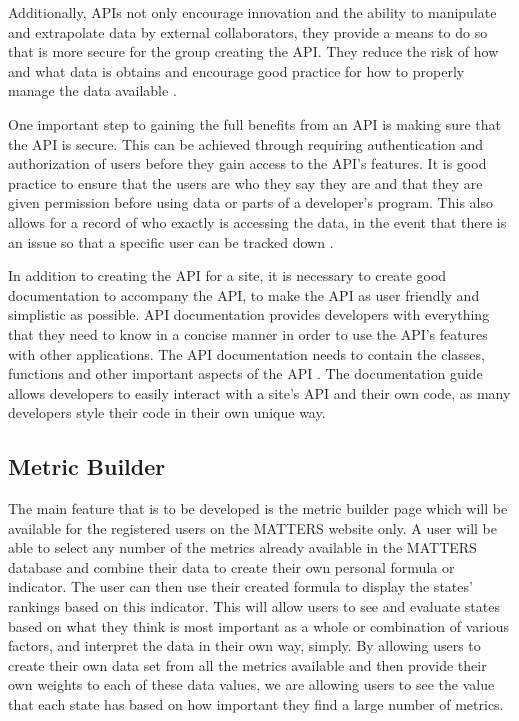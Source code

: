 		Additionally, APIs not only encourage innovation and the ability to manipulate and 
		extrapolate data by external collaborators, they provide a means to do so that is 
		more secure for the group creating the API. They reduce the risk of how and what data 
		is obtains and encourage good practice for how to properly manage the data 
		available \cite{readwrite}.

	One important step to gaining the full benefits from an API is making sure that the API is 
	secure. This can be achieved through requiring authentication and authorization of users 
	before they gain access to the API’s features. It is good practice to ensure that the users 
	are who they say they are and that they are given permission before using data or parts of 
	a developer’s program. This also allows for a record of who exactly is accessing the data, 
	in the event that there is an issue so that a specific user can be tracked down \cite{jisc}.

	In addition to creating the API for a site, it is necessary to create good documentation to 
	accompany the API, to make the API as user friendly and simplistic as possible. 
	API documentation provides developers with everything that they need to know in a concise 
	manner in order to use the API’s features with other applications. The API documentation 
	needs to contain the classes, functions and other important aspects of the API \cite{cio}. 
	The documentation guide allows developers to easily interact with a site’s API and their 
	own code, as many developers style their code in their own unique way. 

	\subsection{Metric Builder}

		The main feature that is to be developed is the metric builder page which will be available 
		for the registered users on the MATTERS website only. A user will be able to select any 
		number of the metrics already available in the MATTERS database and combine their data to 
		create their own personal formula or indicator. The user can then use their created formula 
		to display the states' rankings based on this indicator. This will allow users to see and 
		evaluate states based on what they think is most important as a whole or combination of 
		various factors, and interpret the data in their own way, simply. By allowing users to 
		create their own data set from all the metrics available and then provide their own weights 
		to each of these data values, we are allowing users to see the value that each state has 
		based on how important they find a large number of metrics.

